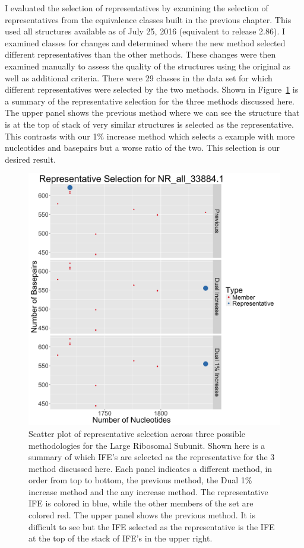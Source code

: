 I evaluated the selection of representatives by examining the selection of
representatives from the equivalence classes built in the previous chapter. This
used all structures available as of July 25, 2016 (equivalent to release 2.86).
I examined classes for changes and determined where the new method selected
different representatives than the other methods. These changes were then
examined manually to assess the quality of the structures using the original as
well as additional criteria. There were 29 classes in the data set for which
different representatives were selected by the two methods. Shown in
Figure~\ref{fig:hm-lsu-rep} is a summary of the representative selection for the
three methods discussed here. The upper panel shows the previous method where we
can see the structure that is at the top of stack of very similar structures is
selected as the representative. This contrasts with our 1\% increase method which
selects a example with more nucleotides and basepairs but a worse ratio of the
two. This selection is our desired result.

\begin{figure}
  \includegraphics[width=\textwidth]{chapter-4/figs/hm-lsu-rep}
  \caption{Scatter plot of representative selection across three possible
    methodologies for the \HM{} Large Ribosomal Subunit. Shown here is a summary
    of which IFE’s are selected as the representative for the 3 method discussed
    here. Each panel indicates a different method, in order from top to bottom,
    the previous method, the Dual 1\% increase method and the any increase
    method. The representative IFE is colored in blue, while the other members
    of the set are colored red. The upper panel shows the previous method. It is
    difficult to see but the IFE selected as the representative is the IFE at
    the top of the stack of IFE’s
  in the upper right.}
  \label{fig:hm-lsu-rep}
\end{figure}

